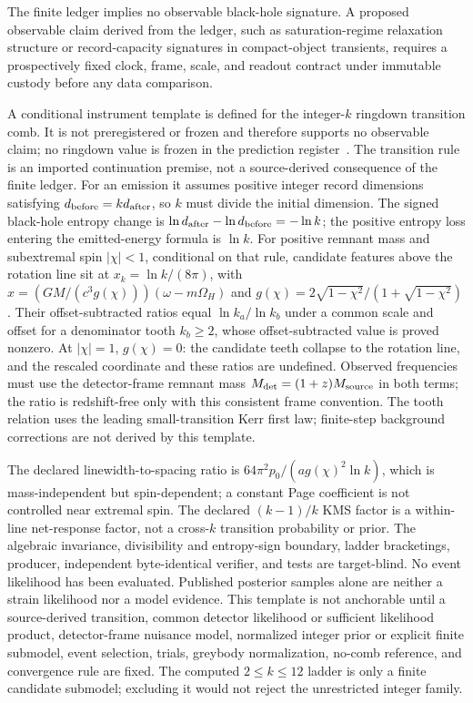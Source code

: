 \documentclass[11pt]{article}
\theoremstyle{remark}
\begin{document}
The finite ledger implies no observable black-hole signature. A proposed
observable claim derived from the ledger, such as
saturation-regime relaxation structure or record-capacity signatures in
compact-object transients, requires a prospectively fixed clock, frame, scale,
and readout contract under immutable custody before any data comparison.

A conditional instrument template is defined for the integer-\(k\) ringdown
transition comb. It is not preregistered or frozen and therefore supports no
observable claim; no ringdown value is frozen in the prediction
register~\cite{ophladder}. The transition rule is an imported
continuation premise, not a source-derived consequence of the finite ledger.
For an emission it assumes positive integer record dimensions satisfying
\(d_{\rm before}=k d_{\rm after}\), so \(k\) must divide the initial
dimension. The signed black-hole entropy change is
\(\ln d_{\rm after}-\ln d_{\rm before}=-\ln k\); the positive entropy loss
entering the emitted-energy formula is \(\ln k\). For positive remnant mass
and subextremal spin \(|\chi|<1\), conditional on that rule,
candidate features above the rotation line sit at
\(x_k=\ln k/(8\pi)\), with
\(x=(GM/(c^3 g(\chi)))(\omega-m\Omega_H)\) and
\(g(\chi)=2\sqrt{1-\chi^2}/(1+\sqrt{1-\chi^2})\). Their
offset-subtracted ratios equal \(\ln k_a/\ln k_b\) under a common scale and
offset for a denominator tooth \(k_b\ge2\), whose offset-subtracted value is
proved nonzero. At \(|\chi|=1\), \(g(\chi)=0\): the candidate teeth collapse
to the rotation line, and the rescaled coordinate and these ratios are undefined.
Observed frequencies must use the detector-frame remnant mass
\(M_{\rm det}=(1+z)M_{\rm source}\) in both terms; the ratio is redshift-free
only with this consistent frame convention. The tooth relation uses the
leading small-transition Kerr first law; finite-step background corrections
are not derived by this template.

The declared linewidth-to-spacing ratio is
\(64\pi^2p_0/(a g(\chi)^2\ln k)\), which is mass-independent but
spin-dependent; a constant Page coefficient is not controlled near extremal
spin. The declared \((k-1)/k\) KMS factor is a within-line net-response
factor, not a cross-\(k\) transition probability or prior. The algebraic
invariance, divisibility and entropy-sign boundary,
ladder bracketings, producer, independent byte-identical verifier, and tests
are target-blind. No event likelihood has been evaluated. Published posterior
samples alone are neither a strain likelihood nor a model evidence. This template is not anchorable until a source-derived transition, common detector
likelihood or sufficient likelihood product, detector-frame nuisance model,
normalized integer prior or explicit finite submodel, event selection, trials,
greybody normalization, no-comb reference, and convergence rule are fixed.
The computed \(2\le k\le12\) ladder is only a finite candidate submodel;
excluding it would not reject the unrestricted integer family.
\end{document}

